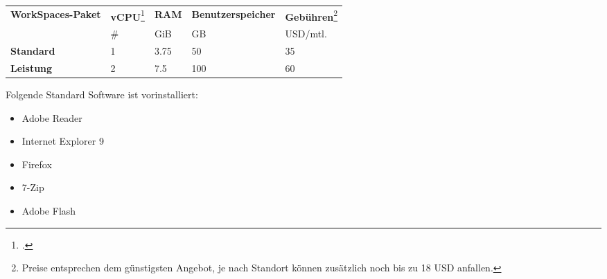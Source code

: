 
\begin{table}[H]
	\centering
	\small\renewcommand{\arraystretch}{1.4}  
	\begin{tabularx}{0.9\textwidth}{X | Y | Y | Y | Y }
		\hline
		\textbf{WorkSpaces-Paket} & \textbf{vCPU}\footcite{Virtual_CPUs_with_Amazon_Web_Services_2014-11-15} & \textbf{RAM} & \textbf{Benutzerspeicher} & \textbf{Gebühren}\footnote{Preise entsprechen dem günstigsten Angebot, je nach Standort können zusätzlich noch bis zu 18 USD anfallen.}\\
		 & \# & GiB & GB & USD/mtl.\\
		\hline
			\textbf{Standard} & 1 & 3.75 & 50 & 35\\
			\textbf{Leistung} & 2 & 7.5 & 100 & 60\\
		\hline
	\end{tabularx}
\end{table}

Folgende Standard Software ist vorinstalliert:
\begin{itemize}
	\item Adobe Reader
	\item Internet Explorer 9
	\item Firefox
	\item 7-Zip
	\item Adobe Flash
\end{itemize}

